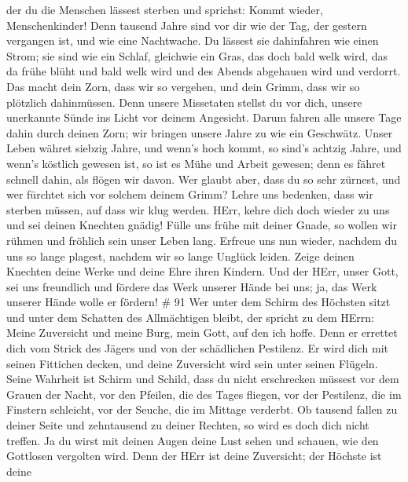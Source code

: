 der du die Menschen lässest sterben und sprichst: Kommt wieder,
Menschenkinder!  Denn tausend Jahre sind vor dir wie der
Tag, der gestern vergangen ist, und wie eine Nachtwache.  Du
lässest sie dahinfahren wie einen Strom; sie sind wie ein Schlaf,
gleichwie ein Gras, das doch bald welk wird,  das da frühe
blüht und bald welk wird und des Abends abgehauen wird und verdorrt.
 Das macht dein Zorn, dass wir so vergehen, und dein Grimm,
dass wir so plötzlich dahinmüssen.  Denn unsere Missetaten
stellst du vor dich, unsere unerkannte Sünde ins Licht vor deinem
Angesicht.  Darum fahren alle unsere Tage dahin durch deinen
Zorn; wir bringen unsere Jahre zu wie ein Geschwätz.  Unser
Leben währet siebzig Jahre, und wenn's hoch kommt, so sind's achtzig
Jahre, und wenn's köstlich gewesen ist, so ist es Mühe und Arbeit
gewesen; denn es fähret schnell dahin, als flögen wir davon.
 Wer glaubt aber, dass du so sehr zürnest, und wer fürchtet
sich vor solchem deinem Grimm?  Lehre uns bedenken, dass
wir sterben müssen, auf dass wir klug werden.  HErr, kehre
dich doch wieder zu uns und sei deinen Knechten gnädig! 
Fülle uns frühe mit deiner Gnade, so wollen wir rühmen und fröhlich sein
unser Leben lang.  Erfreue uns nun wieder, nachdem du uns
so lange plagest, nachdem wir so lange Unglück leiden. 
Zeige deinen Knechten deine Werke und deine Ehre ihren Kindern.
 Und der HErr, unser Gott, sei uns freundlich und fördere
das Werk unserer Hände bei uns; ja, das Werk unserer Hände wolle er
fördern! \# 91  Wer unter dem Schirm des Höchsten sitzt und
unter dem Schatten des Allmächtigen bleibt,  der spricht zu
dem HErrn: Meine Zuversicht und meine Burg, mein Gott, auf den ich
hoffe.  Denn er errettet dich vom Strick des Jägers und von
der schädlichen Pestilenz.  Er wird dich mit seinen
Fittichen decken, und deine Zuversicht wird sein unter seinen Flügeln.
Seine Wahrheit ist Schirm und Schild,  dass du nicht
erschrecken müssest vor dem Grauen der Nacht, vor den Pfeilen, die des
Tages fliegen,  vor der Pestilenz, die im Finstern
schleicht, vor der Seuche, die im Mittage verderbt.  Ob
tausend fallen zu deiner Seite und zehntausend zu deiner Rechten, so
wird es doch dich nicht treffen.  Ja du wirst mit deinen
Augen deine Lust sehen und schauen, wie den Gottlosen vergolten wird.
 Denn der HErr ist deine Zuversicht; der Höchste ist deine
